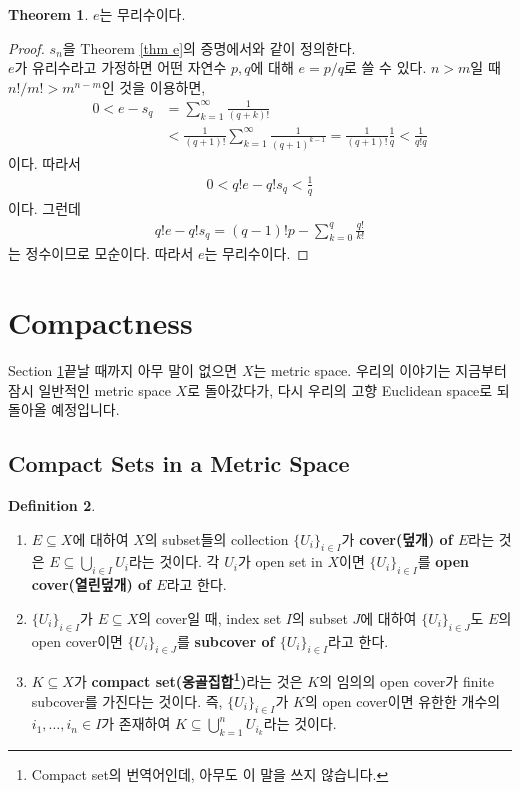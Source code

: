 \documentclass[12pt]{article}
\theoremstyle{definition}
\newtheorem{thm}{Theorem}[section]
\newtheorem{defn}[thm]{Definition}
\begin{document}
\begin{thm}
	\(e\)는 무리수이다.
\end{thm}
\begin{proof}
	\(s_n\)을 Theorem \ref{thm e}의 증명에서와 같이 정의한다.\\
	\(e\)가 유리수라고 가정하면 어떤 자연수 \(p, q\)에 대해 \(e = p/q\)로 쓸 수 있다. \(n > m\)일 때 \(n!/m! > m^{n-m}\)인 것을 이용하면,
	\begin{align*}
		0 < e - s_q &= \sum_{k=1}^\infty \frac{1}{(q+k)!}\\
		&< \frac{1}{(q+1)!}\sum_{k=1}^\infty \frac{1}{(q+1)^{k-1}} = \frac{1}{(q+1)!} \frac{1}{q} < \frac{1}{q!q}
	\end{align*}
	이다. 따라서
	\begin{align*}
		0 < q!e - q!s_q < \frac{1}{q}
	\end{align*}
	이다. 그런데
	\begin{align*}
		q!e - q!s_q = (q-1)!p - \sum_{k=0}^q \frac{q!}{k!}
	\end{align*}
	는 정수이므로 모순이다. 따라서 \(e\)는 무리수이다.
\end{proof}


\newpage


\section{Compactness} \label{sec cpt}

Section \ref{sec cpt}\이 끝날 때까지 아무 말이 없으면 \(X\)는 metric space. 우리의 이야기는 지금부터 잠시 일반적인 metric space \(X\)로 돌아갔다가, 다시 우리의 고향 Euclidean space로 되돌아올 예정입니다.

\subsection{Compact Sets in a Metric Space}

	\begin{defn}
		\quad
		\begin{enumerate}[label=(\alph*), leftmargin=2\parindent]
			\item
			\(E \subseteq X\)에 대하여 \(X\)의 subset들의 collection \(\{U_i\}_{i \in I}\)가 \textbf{cover(덮개) of \(E\)}라는 것은 \(E \subseteq \bigcup_{i \in I} U_i\)라는 것이다. 각 \(U_i\)가 open set in \(X\)이면 \(\{U_i\}_{i \in I}\)를 \textbf{open cover(열린덮개) of \(E\)}라고 한다.
			\item
			\(\{U_i\}_{i \in I}\)가 \(E \subseteq X\)의 cover일 때, index set \(I\)의 subset \(J\)에 대하여 \(\{U_i\}_{i \in J}\)도 \(E\)의 open cover이면 \(\{U_i\}_{i \in J}\)를 \textbf{subcover of \(\{U_i\}_{i \in I}\)}라고 한다.
			\item
			\(K \subseteq X\)가 \textbf{compact set(옹골집합\footnote{Compact set의 번역어인데, 아무도 이 말을 쓰지 않습니다.})}라는 것은 \(K\)의 임의의 open cover가 finite subcover를 가진다는 것이다. 즉, \(\{U_i\}_{i \in I}\)가 \(K\)의 open cover이면 유한한 개수의 \(i_1, \ldots, i_n \in I\)가 존재하여 \(K \subseteq \bigcup_{k=1}^n U_{i_k}\)라는 것이다.
		\end{enumerate}	
	\end{defn}
\end{document}
